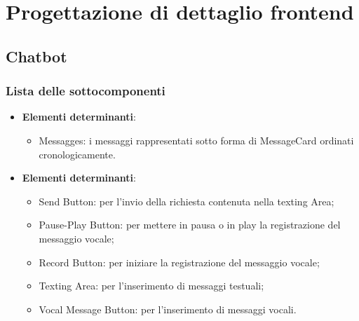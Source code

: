 \documentclass[10pt, a4paper]{article}
\begin{document}

\newpage

\section{Progettazione di dettaglio frontend}

\subsection{Chatbot}

\subsubsection{Lista delle sottocomponenti}

\label{ChatContentDettaglio}
\begin{itemize}
    \item \textbf{Elementi determinanti}:
     \begin{itemize}
        \item Messagges: i messaggi rappresentati sotto forma di MessageCard ordinati cronologicamente.
    \end{itemize}
\end{itemize}


\label{ChatFormDettaglio}
\begin{itemize}
    \item \textbf{Elementi determinanti}:
    \begin{itemize}
        \item Send Button: per l'invio della richiesta contenuta nella texting Area;
        \item Pause-Play Button: per mettere in pausa o in play la registrazione del messaggio vocale;
        \item Record Button: per iniziare la registrazione del messaggio vocale;
        \item Texting Area: per l'inserimento di messaggi testuali;
        \item Vocal Message Button: per l'inserimento di messaggi vocali.
    \end{itemize}
\end{itemize}
\end{document}
